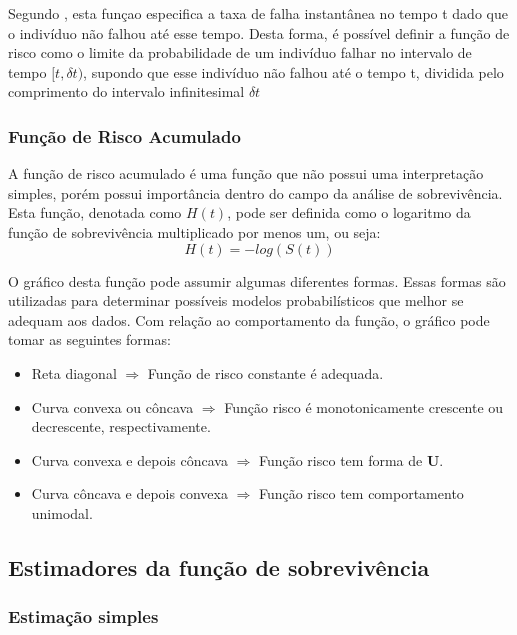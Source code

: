 \documentclass[a4paper,12pt]{article}
\begin{document}
Segundo , esta funçao especifica a taxa de falha instantânea no tempo t dado que o indivíduo não falhou até esse tempo. Desta forma, é possível definir a função de risco como o limite da probabilidade de um indivíduo falhar no intervalo de tempo $[t, \delta t)$, supondo que esse indivíduo não falhou até o tempo t, dividida pelo comprimento do intervalo infinitesimal $\delta t$

\subsubsection{Função de Risco Acumulado}

A função de risco acumulado é uma função que não possui uma interpretação simples, porém possui importância dentro do campo da análise de sobrevivência. Esta função, denotada como $H(t)$, pode ser definida como o logaritmo da função de sobrevivência multiplicado por menos um, ou seja:
\begin{equation} \label{eq:riskcum}
 H(t) = -log(S(t))
\end{equation}

O gráfico desta função pode assumir algumas diferentes formas. Essas formas são utilizadas para determinar possíveis modelos probabilísticos que melhor se adequam aos dados. Com relação ao comportamento da função, o gráfico pode tomar as seguintes formas:

\begin{itemize}
	\item Reta diagonal $\Rightarrow$ Função de risco constante é adequada.
	\item Curva convexa ou côncava $\Rightarrow$ Função
risco é monotonicamente crescente ou decrescente, respectivamente.
	\item Curva convexa e depois côncava $\Rightarrow$ Função risco tem forma de \textbf{U}.
	\item Curva côncava e depois convexa $\Rightarrow$ Função risco tem comportamento unimodal.
\end{itemize}

\subsection{Estimadores da função de sobrevivência}

\subsubsection{Estimação simples}
\end{document}

